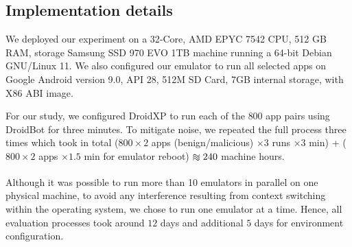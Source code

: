 \subsection{Implementation details}\label{sec:hardware}

We deployed our experiment on a 32-Core, AMD EPYC 7542 CPU, 512 GB RAM, storage Samsung SSD 970 EVO 1TB machine running a 64-bit Debian  GNU/Linux 11. We also configured our emulator to run all selected apps on Google Android version 9.0, API 28, 512M SD Card, 7GB internal storage, with X86 ABI image.

For our study, we configured DroidXP to run each of the $800$ app pairs using DroidBot for three minutes. To mitigate noise, we repeated the full process three times which took in total ($800 \times 2$ apps (benign/malicious) $\times 3$ runs $\times 3$ min) + ($800 \times 2$ apps $\times 1.5$ min for emulator reboot) $\apeq 240$ machine hours.


Although it was possible to run more than 10 emulators in parallel on one physical machine, to avoid any interference resulting from context switching within the operating system, we chose to run one emulator at a time. Hence, all evaluation processes took around $12$ days and additional $5$ days for environment configuration.



